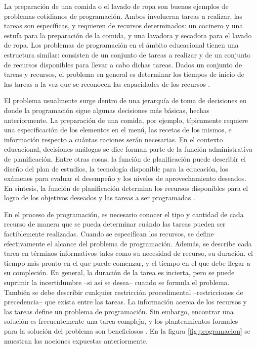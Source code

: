 \documentclass[draft,12pt,headsepline,footsepline,paper=letter]{scrreprt}
\begin{document}
La preparación de una comida o el lavado de ropa son buenos ejemplos de problemas cotidianos de programación. Ambos involucran tareas a realizar, las tareas son específicas, y requieren de recursos determinados: un cocinero y una estufa para la preparación de la comida, y una lavadora y secadora para el lavado de ropa.  Los problemas de programación en el ámbito educacional tienen una estructura similar: consisten de un conjunto de tareas a realizar y de un conjunto de recursos disponibles para llevar a cabo dichas tareas. Dados un conjunto de tareas y recursos, el problema en general es determinar los tiempos de inicio de las tareas a la vez que se reconocen las capacidades de los recursos \citep[p.~2]{Baker2009}.

El problema usualmente surge dentro de una jerarquía de toma de decisiones en donde la programación sigue algunas decisiones más básicas, hechas anteriormente. La preparación de una comida, por ejemplo, típicamente requiere una especificación de los elementos en el menú, las recetas de los mismos, e información respecto a cuántas raciones serán necesarias. En el contexto educacional, decisiones análogas se dice forman parte de la función administrativa de planificación. Entre otras cosas, la función de planificación puede describir el diseño del plan de estudios, la tecnología disponible para la educación, los exámenes para evaluar el desempeño y los niveles de aprovechamiento deseados. En síntesis, la función de planificación determina los recursos disponibles para el logro de los objetivos deseados y las tareas a ser programadas \citep[p.~2]{Baker2009}.

En el proceso de programación, es necesario conocer el tipo y cantidad de cada recurso de manera que se pueda determinar cuándo las tareas pueden ser factiblemente realizadas. Cuando se especifícan los recursos, se define efectivamente el alcance del problema de programación. Además, se describe cada tarea en términos informativos tales como su necesidad de recurso, su duración, el tiempo más pronto en el que puede comenzar, y el tiempo en el que debe llegar a su compleción. En general, la duración de la tarea es incierta, pero se puede suprimir la incertidumbre –si así se desea– cuando se formula el problema. También se debe describir cualquier restricción procedimental –restricciones de precedencia– que exista entre las tareas. La información acerca de los recursos y las tareas define un problema de programación. Sin embargo, encontrar una solución es frecuentemente una tarea compleja, y los planteamientos formales para la solución del problema son beneficiosos \citep[p.~2]{Baker2009}. En la figura \ref{fig:programacion} se muestran las nociones expuestas anteriormente.
\end{document}
